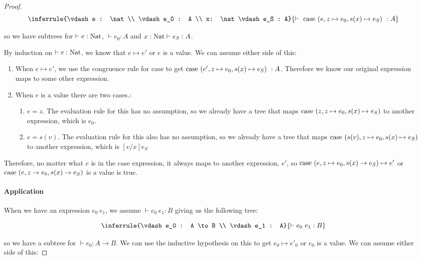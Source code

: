 \begin{proof}
$$
\inferrule {\vdash e : \nat \\  \vdash e_0 : A \\  x: \nat\vdash e_S : A}
  {\vdash \ \case \ (e, z \mapsto e_0 , s(x) \mapsto e_S) \  : A}  
$$

so we have subtrees for $\vdash e : \operatorname{Nat}$, $ \vdash e_0 : A$ and $ x:\operatorname{Nat} \vdash e_S : A$.

By induction on $\vdash e : \operatorname{Nat}$, we know that $e \mapsto e'$ or $e$ is a value. We can assume either side of this:

\begin{enumerate}
\item{When $e \mapsto e'$, we use the congruence rule for case to get $\operatorname{case} \ (e', z \mapsto e_0 , s(x) \mapsto e_S) \  : A$. Therefore we know our original expression maps to some other expression.}%
\item{When $e$ is a value there are two cases.:
\begin{enumerate}
\item{$e = z$. The evaluation rule for this has no assumption, so we already have a tree that maps $\operatorname{case} \ (z, z \mapsto e_0 , s(x) \mapsto e_S)$ to another expression, which is $e_0$.}
\item{$e = s(v)$. The evaluation rule for this also has no assumption, so we already have a tree that maps $\operatorname{case} \ (s(v), z \mapsto e_0 , s(x) \mapsto e_S)$ to another expression, which is $[v/x]e_S$ }
\end{enumerate}
}
\end{enumerate}

Therefore, no matter what $e$ is in the case expression, it always maps to another expression, $e'$, so $\operatorname{case} \ (e, z \mapsto e_0 , s(x) \to e_S) \mapsto e'$ or $\operatorname{case} \ (e, z \to e_0 , s(x) \to e_S)$ is a value is true.

\paragraph{Application} When we have an expression $e_0 \ e_1$, we assume $\vdash e_0 \ e_1 : B$ giving us the following tree:

$$
\inferrule {\vdash e_0 : A \to B \\  \vdash e_1 : A}
  {\vdash e_0 \ e_1 : B}
$$

so we have a subtree for $\vdash e_0 : A \to B$. We can use the inductive hypothesis on this to get $e_0 \mapsto e'_0$ or $e_0$ is a value. We can assume either side of this:


\end{proof}
